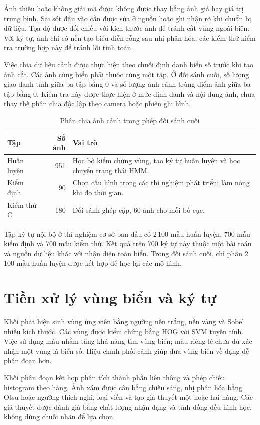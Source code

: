 Ảnh thiếu hoặc không giải mã được không được thay bằng ảnh giả hay giá trị trung bình. Sai sót đầu vào cần được sửa ở nguồn hoặc ghi nhận rõ khi chuẩn bị dữ liệu. Tọa độ được đối chiếu với kích thước ảnh để tránh cắt vùng ngoài biên. Với ký tự, ảnh chỉ có nền tạo biểu diễn rỗng sau nhị phân hóa; các kiểm thử kiểm tra trường hợp này để tránh lỗi tính toán.

Việc chia dữ liệu cảnh được thực hiện theo chuỗi định danh biển số trước khi tạo ảnh cắt. Các ảnh cùng biển phải thuộc cùng một tập. Ở đối sánh cuối, số lượng giao danh tính giữa ba tập bằng 0 và số lượng ảnh cảnh trùng điểm ảnh giữa ba tập bằng 0. Kiểm tra này được thực hiện ở mức định danh và nội dung ảnh, chưa thay thế phân chia độc lập theo camera hoặc phiên ghi hình.

\begin{table}[H]\centering
\caption{Phân chia ảnh cảnh trong phép đối sánh cuối}\label{tab:splits}
\begin{tabularx}{\textwidth}{l r Y}
\toprule
Tập & Số ảnh & Vai trò\\
\midrule
Huấn luyện & 951 & Học bộ kiểm chứng vùng, tạo ký tự huấn luyện và học chuyển trạng thái HMM.\\
Kiểm định & 90 & Chọn cấu hình trong các thí nghiệm phát triển; làm nóng khi đo thời gian.\\
Kiểm thử C & 180 & Đối sánh ghép cặp, 60 ảnh cho mỗi bố cục.\\
\bottomrule
\end{tabularx}
\end{table}

Tập ký tự nội bộ ở thí nghiệm cơ sở ban đầu có 2\,100 mẫu huấn luyện, 700 mẫu kiểm định và 700 mẫu kiểm thử. Kết quả trên 700 ký tự này thuộc một bài toán và nguồn dữ liệu khác với nhận diện toàn biển. Trong đối sánh cuối, chỉ phần 2\,100 mẫu huấn luyện được kết hợp để học lại các mô hình.

\section{Tiền xử lý vùng biển và ký tự}
Khối phát hiện sinh vùng ứng viên bằng ngưỡng nền trắng, nền vàng và Sobel nhiều kích thước. Các vùng được kiểm chứng bằng HOG với SVM tuyến tính. Việc sử dụng màu nhằm tăng khả năng tìm vùng biển; màu riêng lẻ chưa đủ xác nhận một vùng là biển số. Hiệu chỉnh phối cảnh giúp đưa vùng biển về dạng dễ phân đoạn hơn.

Khối phân đoạn kết hợp phân tích thành phần liên thông và phép chiếu histogram theo hàng. Ảnh xám được cân bằng chiếu sáng, nhị phân hóa bằng Otsu hoặc ngưỡng thích nghi, loại viền và tạo giả thuyết một hoặc hai hàng. Các giả thuyết được đánh giá bằng chất lượng nhận dạng và tính đồng đều hình học, không dùng chuỗi nhãn để lựa chọn.


